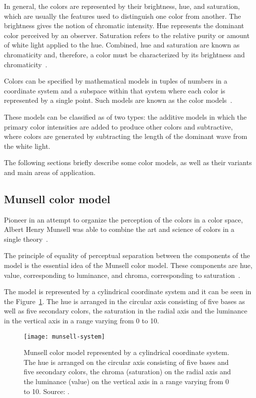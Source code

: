 In general, the colors are represented by their brightness, hue, and saturation, which are usually the features used to distinguish one color from another. The brightness gives the notion of chromatic intensity. Hue represents the dominant color perceived by an observer. Saturation refers to the relative purity or amount of white light applied to the hue. Combined, hue and saturation are known as chromaticity and, therefore, a color must be characterized by its brightness and chromaticity~\citep{gonzalez:02}.

Colors can be specified by mathematical models in tuples of numbers in a coordinate system and a subspace within that system where each color is represented by a single point. Such models are known as the color models~\citep{gonzalez:02}.

These models can be classified as of two types: the additive models in which the primary color intensities are added to produce other colors and subtractive, where colors are generated by subtracting the length of the dominant wave from the white light.

The following sections briefly describe some color models, as well as their variants and main areas of application.

\subsection{Munsell color model}
\label{sec:modelo_cores_munsell}

Pioneer in an attempt to organize the perception of the colors in a color space, Albert Henry Munsell was able to combine the art and science of colors in a single theory~\citep{konstantinos:00}.

The principle of equality of perceptual separation between the components of the model is the essential idea of the Munsell color model. These components are hue, value, corresponding to luminance, and chroma, corresponding to saturation~\citep{konstantinos:00}.

The model is represented by a cylindrical coordinate system and it can be seen in the Figure~\ref{fig:munsell-system}. The hue is arranged in the circular axis consisting of five bases as well as five secondary colors, the saturation in the radial axis and the luminance in the vertical axis in a range varying from 0 to 10.

\begin{figure}[!ht]
  \centering
  \texttt{[image: munsell-system]}
  \caption[Munsell color model.]{Munsell color model represented by a cylindrical coordinate system. The hue is arranged on the circular axis consisting of five bases and five secondary colors, the chroma (saturation) on the radial axis and the luminance (value) on the vertical axis in a range varying from 0 to 10. Source: \citet{rus:07}.}
  \label{fig:munsell-system} 
\end{figure}

